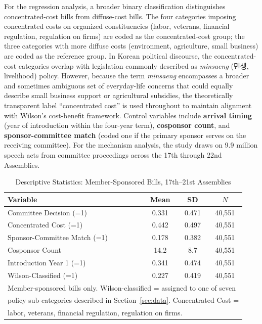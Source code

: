 \documentclass[11pt]{article}
\begin{document}
For the regression analysis, a broader binary classification distinguishes concentrated-cost bills from diffuse-cost bills. The four categories imposing concentrated costs on organized constituencies (labor, veterans, financial regulation, regulation on firms) are coded as the concentrated-cost group; the three categories with more diffuse costs (environment, agriculture, small business) are coded as the reference group. In Korean political discourse, the concentrated-cost categories overlap with legislation commonly described as \textit{minsaeng} (민생, livelihood) policy. However, because the term \textit{minsaeng} encompasses a broader and sometimes ambiguous set of everyday-life concerns that could equally describe small business support or agricultural subsidies, the theoretically transparent label ``concentrated cost'' is used throughout to maintain alignment with Wilson's cost-benefit framework. Control variables include \textbf{arrival timing} (year of introduction within the four-year term), \textbf{cosponsor count}, and \textbf{sponsor-committee match} (coded one if the primary sponsor serves on the receiving committee). For the mechanism analysis, the study draws on 9.9 million speech acts from committee proceedings across the 17th through 22nd Assemblies.

\begin{table}[htbp]
\centering
\caption{Descriptive Statistics: Member-Sponsored Bills, 17th--21st Assemblies}
\label{tab:desc}
\begin{tabular}{lccc}
\toprule
Variable & Mean & SD & $N$ \\
\midrule
Committee Decision (=1) & 0.331 & 0.471 & 40,551 \\
Concentrated Cost (=1) & 0.442 & 0.497 & 40,551 \\
Sponsor-Committee Match (=1) & 0.178 & 0.382 & 40,551 \\
Cosponsor Count & 14.2 & 8.7 & 40,551 \\
Introduction Year 1 (=1) & 0.341 & 0.474 & 40,551 \\
Wilson-Classified (=1) & 0.227 & 0.419 & 40,551 \\
\bottomrule
\multicolumn{4}{l}{\footnotesize Member-sponsored bills only. Wilson-classified = assigned to one of seven} \\
\multicolumn{4}{l}{\footnotesize policy sub-categories described in Section~\ref{sec:data}. Concentrated Cost =} \\
\multicolumn{4}{l}{\footnotesize labor, veterans, financial regulation, regulation on firms.} \\
\end{tabular}
\end{table}
\end{document}
